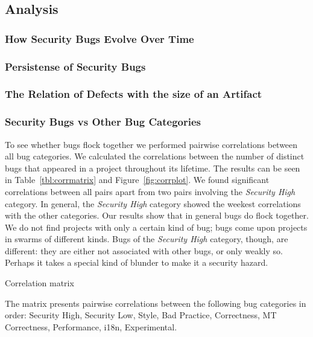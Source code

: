 \documentclass[conference]{IEEEtran}
\begin{document}
\subsection{Analysis}
\label{sec:analysis}

\subsubsection{How Security Bugs Evolve Over Time}

\subsubsection{Persistense of Security Bugs}

\subsubsection{The Relation of Defects with the size of an Artifact}

\subsubsection{Security Bugs {\sc vs} Other Bug Categories}

To see whether bugs flock together we performed pairwise correlations
between all bug categories. We calculated the correlations between the
number of distinct bugs that appeared in a project throughout its
lifetime. The results can be seen in Table~\ref{tbl:corrmatrix} and
Figure~\ref{fig:corrplot}. We found significant correlations between
all pairs apart from two pairs involving the {\it Security High}
category. In general, the {\it Security High} category showed the
weekest correlations with the other categories. Our results show that
in general bugs do flock together. We do not find projects with only a
certain kind of bug; bugs come upon projects in swarms of different
kinds. Bugs of the {\it Security High} category, though, are
different: they are either not associated with other bugs, or only
weakly so. Perhaps it takes a special kind of blunder to make it a
security hazard.
\begin{table}
  \begin{threeparttable}
    \centering
    \caption{Correlation matrix}
    \label{tbl:corrmatrix}
    
    \begin{tablenotes}
      \footnotesize
      \item The matrix presents pairwise correlations between the
        following bug categories in order: Security High, Security
        Low, Style, Bad Practice, Correctness, MT Correctness,
        Performance, i18n, Experimental.
    \end{tablenotes}
  \end{threeparttable}
\end{table}
\end{document}
